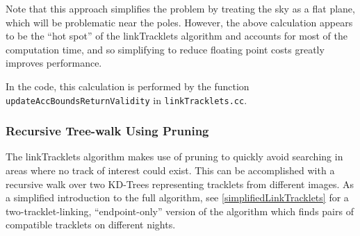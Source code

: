Note that this approach simplifies the problem by treating the sky as
a flat plane, which will be problematic near the poles.  However, the
above calculation appears to be the ``hot spot'' of the linkTracklets
algorithm and accounts for most of the computation time, and so
simplifying to reduce floating point costs greatly improves
performance.

In the code, this calculation is performed by the function 
{\tt updateAccBoundsReturnValidity} in {\tt linkTracklets.cc}.

\subsubsection{Recursive Tree-walk Using Pruning}

The linkTracklets algorithm makes use of pruning to quickly avoid
searching in areas where no track of interest could exist.  This can
be accomplished with a recursive walk over two KD-Trees representing
tracklets from different images.  As a simplified introduction to the
full algorithm, see \ref{simplifiedLinkTracklets} for a
two-tracklet-linking, ``endpoint-only'' version of the algorithm which
finds pairs of compatible tracklets on different nights.

